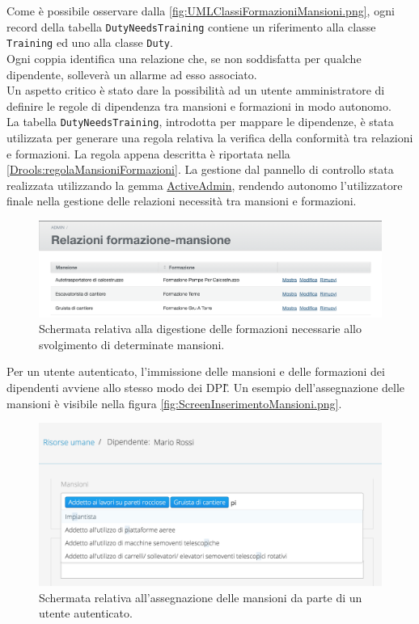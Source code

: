 Come è possibile osservare dalla \autoref{fig:UMLClassiFormazioniMansioni.png}, ogni record della tabella \texttt{DutyNeedsTraining} contiene un riferimento alla classe \texttt{Training} ed uno alla classe \texttt{Duty}.\\
Ogni coppia identifica una relazione che, se non soddisfatta per qualche dipendente, solleverà un allarme ad esso associato.\\
Un aspetto critico è stato dare la possibilità ad un utente amministratore di definire le regole di dipendenza tra mansioni e formazioni in modo autonomo. \\
La tabella \texttt{DutyNeedsTraining}, introdotta per mappare le dipendenze, è stata utilizzata per generare una regola relativa la verifica della conformità tra relazioni e formazioni. La regola appena descritta è riportata nella \autoref{Drools:regolaMansioniFormazioni}.
La gestione dal pannello di controllo  stata realizzata utilizzando la gemma \hyperref[sec:ActiveAdmin]{ActiveAdmin}, rendendo  autonomo l'utilizzatore finale nella gestione delle relazioni necessità tra mansioni e formazioni.
\begin{figure}[H]
	\begin{center}
		\includegraphics[width=14cm]{Pics/ScreenFormazioneMansioneAdmin.png}
		\caption{Schermata relativa alla digestione delle formazioni necessarie allo svolgimento di determinate mansioni.}
		\label{fig:ScreenFormazioneMansioneAdmin.png}
	\end{center}
\end{figure}
Per un utente autenticato, l'immissione delle mansioni e delle formazioni dei dipendenti avviene allo stesso modo dei \gls{DPI}\G. Un esempio dell'assegnazione delle mansioni è visibile nella figura  \autoref{fig:ScreenInserimentoMansioni.png}.
\begin{figure}[H]
	\begin{center}
		\includegraphics[width=14cm]{Pics/ScreenInserimentoMansioni.png}
		\caption{Schermata relativa all'assegnazione delle mansioni da parte di un utente autenticato.}
		\label{fig:ScreenInserimentoMansioni.png}
	\end{center}
\end{figure}
